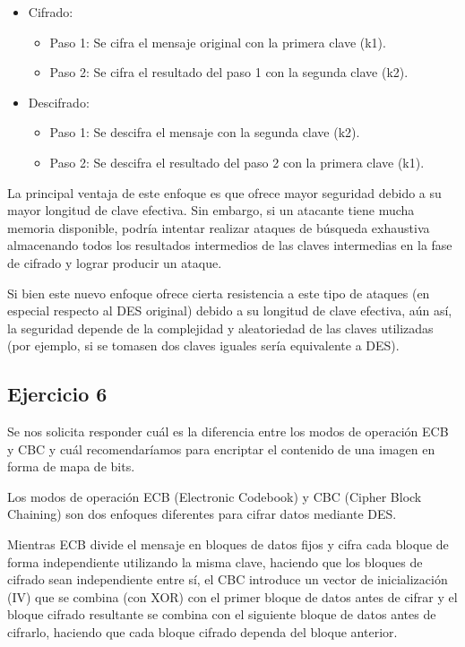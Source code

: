 \documentclass[11pt]{article}
\begin{document}
\begin{itemize}
\item Cifrado:

\begin{itemize}
\item Paso 1: Se cifra el mensaje original con la primera clave (k1).
\item Paso 2: Se cifra el resultado del paso 1 con la segunda clave (k2).
\end{itemize}

\item Descifrado:

\begin{itemize}
\item Paso 1: Se descifra el mensaje con la segunda clave (k2).
\item Paso 2: Se descifra el resultado del paso 2 con la primera clave (k1).
\end{itemize}

\end{itemize}

La principal ventaja de este enfoque es que ofrece mayor seguridad debido a su mayor longitud de clave efectiva. 
Sin embargo, si un atacante tiene mucha memoria disponible, podría intentar realizar ataques de búsqueda exhaustiva 
almacenando todos los resultados intermedios de las claves intermedias en la fase de cifrado y lograr producir un ataque.

Si bien este nuevo enfoque ofrece cierta resistencia a este tipo de ataques (en especial respecto al DES original)
debido a su longitud de clave efectiva, 
aún así, la seguridad depende de la complejidad y aleatoriedad de las claves utilizadas (por ejemplo, si
se tomasen dos claves iguales sería equivalente a DES).

\subsection*{Ejercicio 6}

Se nos solicita responder cuál es la diferencia entre los modos de operación ECB y CBC y 
cuál recomendaríamos para
encriptar el contenido de una imagen en forma de mapa de bits. 

Los modos de operación ECB (Electronic Codebook) y CBC (Cipher Block Chaining) son dos enfoques 
diferentes para cifrar datos mediante DES.

Mientras ECB divide el mensaje en bloques de datos fijos y cifra cada bloque de forma independiente utilizando la misma clave, 
haciendo que los bloques de cifrado sean independiente entre sí, el CBC 
introduce un vector de inicialización (IV) que se combina (con XOR) con el primer bloque de datos antes de cifrar y
el bloque cifrado resultante se combina con el siguiente bloque de datos antes de cifrarlo, haciendo que 
cada bloque cifrado dependa del bloque anterior.
\end{document}
